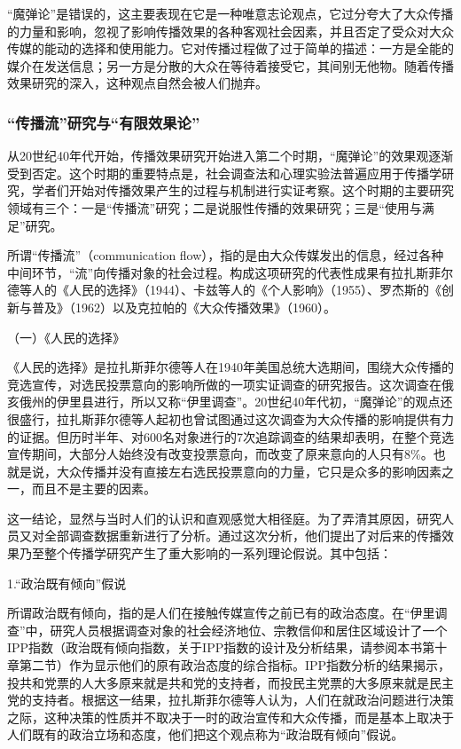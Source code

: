 \documentclass[UTF8,12pt]{ctexart}
\numberwithin{equation}{section} %
\numberwithin{figure}{section}
\numberwithin{table}{section}
\begin{document}
	“魔弹论”是错误的，这主要表现在它是一种唯意志论观点，它过分夸大了大众传播的力量和影响，忽视了影响传播效果的各种客观社会因素，并且否定了受众对大众传媒的能动的选择和使用能力。它对传播过程做了过于简单的描述：一方是全能的媒介在发送信息；另一方是分散的大众在等待着接受它，其间别无他物。随着传播效果研究的深入，这种观点自然会被人们抛弃。
	
	\subsubsection{“传播流”研究与“有限效果论”}
	
	从20世纪40年代开始，传播效果研究开始进入第二个时期，“魔弹论”的效果观逐渐受到否定。这个时期的重要特点是，社会调查法和心理实验法普遍应用于传播学研究，学者们开始对传播效果产生的过程与机制进行实证考察。这个时期的主要研究领域有三个：一是“传播流”研究；二是说服性传播的效果研究；三是“使用与满足”研究。
	
	所谓“传播流”（communication flow），指的是由大众传媒发出的信息，经过各种中间环节，“流”向传播对象的社会过程。构成这项研究的代表性成果有拉扎斯菲尔德等人的《人民的选择》（1944）、卡兹等人的《个人影响》（1955）、罗杰斯的《创新与普及》（1962）以及克拉帕的《大众传播效果》（1960）。
	
	（一）《人民的选择》
	
	《人民的选择》是拉扎斯菲尔德等人在1940年美国总统大选期间，围绕大众传播的竞选宣传，对选民投票意向的影响所做的一项实证调查的研究报告。这次调查在俄亥俄州的伊里县进行，所以又称“伊里调查”。20世纪40年代初，“魔弹论”的观点还很盛行，拉扎斯菲尔德等人起初也曾试图通过这次调查为大众传播的影响提供有力的证据。但历时半年、对600名对象进行的7次追踪调查的结果却表明，在整个竞选宣传期间，大部分人始终没有改变投票意向，而改变了原来意向的人只有8\%。也就是说，大众传播并没有直接左右选民投票意向的力量，它只是众多的影响因素之一，而且不是主要的因素。
	
	这一结论，显然与当时人们的认识和直观感觉大相径庭。为了弄清其原因，研究人员又对全部调查数据重新进行了分析。通过这次分析，他们提出了对后来的传播效果乃至整个传播学研究产生了重大影响的一系列理论假说。其中包括：
	
	1.“政治既有倾向”假说
	
	所谓政治既有倾向，指的是人们在接触传媒宣传之前已有的政治态度。在“伊里调查”中，研究人员根据调查对象的社会经济地位、宗教信仰和居住区域设计了一个IPP指数（政治既有倾向指数，关于IPP指数的设计及分析结果，请参阅本书第十章第二节）作为显示他们的原有政治态度的综合指标。IPP指数分析的结果揭示，投共和党票的人大多原来就是共和党的支持者，而投民主党票的大多原来就是民主党的支持者。根据这一结果，拉扎斯菲尔德等人认为，人们在就政治问题进行决策之际，这种决策的性质并不取决于一时的政治宣传和大众传播，而是基本上取决于人们既有的政治立场和态度，他们把这个观点称为“政治既有倾向”假说。
	
\end{document}
